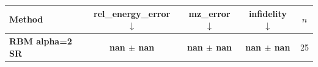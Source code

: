 \begin{tabular}{lcccc}
\toprule
Method & rel\_energy\_error $\downarrow$ & mz\_error $\downarrow$ & infidelity $\downarrow$ & $n$ \\
\midrule
\textbf{RBM alpha=2 SR} & \textbf{nan $\pm$ nan} & \textbf{nan $\pm$ nan} & \textbf{nan $\pm$ nan} & 25 \\
\bottomrule
\end{tabular}
